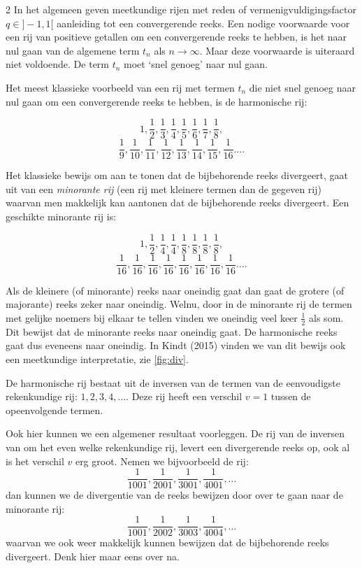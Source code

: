 \begin{multicols}{2}
	In het algemeen geven meetkundige rijen met reden of vermenigvuldigingsfactor $q \in ]-1,1[$ aanleiding tot een convergerende reeks. Een nodige voorwaarde voor een rij van positieve getallen om een convergerende reeks te hebben, is het naar nul gaan van de algemene term $t_n$ als $n \to \infty$. Maar deze voorwaarde is uiteraard niet voldoende. De term $t_n$ moet `snel genoeg' naar nul gaan.
	
	Het meest klassieke voorbeeld van een rij met termen $t_n$ die niet snel genoeg naar nul gaan om een convergerende reeks te hebben, is de harmonische rij: 
	
	\[1, \frac{1}{2}, \frac{1}{3}, \frac{1}{4} , \frac{1}{5}, \frac{1}{6}, \frac{1}{7}, \frac{1}{8},\] 
	\[\frac{1}{9}, \frac{1}{10}, \frac{1}{11}, \frac{1}{12}, \frac{1}{13}, \frac{1}{14}, \frac{1}{15}, \frac{1}{16}\dots.\] 
	
	Het klassieke bewijs om aan te tonen dat de bijbehorende reeks divergeert, gaat uit van een \emph{minorante rij} (een rij met kleinere termen dan de gegeven rij) waarvan men makkelijk kan aantonen dat de bijbehorende reeks divergeert. Een geschikte minorante rij is:  
	
	\[1, \frac{1}{2}, \frac{1}{4}, \frac{1}{4} , \frac{1}{8}, \frac{1}{8}, \frac{1}{8}, \frac{1}{8},\]
	\[\frac{1}{16}, \frac{1}{16}, \frac{1}{16}, \frac{1}{16}, \frac{1}{16}, \frac{1}{16}, \frac{1}{16}, \frac{1}{16}\dots.\] 
	
	Als de kleinere (of minorante) reeks naar oneindig gaat dan gaat de grotere (of majorante) reeks zeker naar oneindig. Welnu, door in de minorante rij de termen met gelijke noemers bij elkaar te tellen vinden we oneindig veel keer $\frac{1}{2}$ als som. Dit bewijst dat de minorante reeks naar oneindig gaat. De harmonische reeks gaat dus eveneens naar oneindig. In Kindt (2015) vinden we van dit bewijs ook een meetkundige interpretatie, zie \autoref{fig:div}.
	
	
	De harmonische rij bestaat uit de inversen van de termen van de eenvoudigste rekenkundige rij: $1, 2, 3, 4, \dots$. Deze rij heeft een verschil $v=1$ tussen de opeenvolgende termen. 
	
	Ook hier kunnen we een algemener resultaat voorleggen. De rij van de inversen van om het even welke rekenkundige rij, levert een divergerende reeks op, ook al is het verschil $v$ erg groot. Nemen we bijvoorbeeld de rij:
	\[\frac{1}{1001}, \frac{1}{2001},\frac{1}{3001},\frac{1}{4001}, \dots \]
	dan kunnen we de divergentie van de reeks bewijzen door over te gaan naar de minorante rij:
	\[\frac{1}{1001}, \frac{1}{2002},\frac{1}{3003},\frac{1}{4004}, \dots \]
	waarvan we ook weer makkelijk kunnen bewijzen dat de bijbehorende reeks divergeert. Denk hier maar eens over na.
	

\end{multicols}
